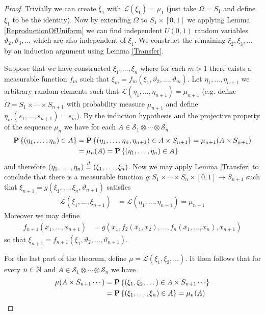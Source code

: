 \begin{proof}
Trivially we can create $\xi_1$ with $\mathcal{L}(\xi_1) = \mu_1$
(just take $\Omega = S_1$ and define $\xi_1$ to be the identity).  Now
by extending $\Omega$ to $S_1 \times [0,1]$ we applying Lemma
\ref{ReproductionOfUniform} we can find independent $U(0,1)$ random
variables $\vartheta_2, \vartheta_3, \dotsc$ which are also
independent of $\xi_1$.  We construct the remaining $\xi_2, \xi_3,
\dotsc$ by an induction argument using Lemma \ref{Transfer}.  

Suppose that we have constructed $\xi_1, \dotsc, \xi_n$ where for each
$m > 1$ there exists a measurable function $f_m$ such that $\xi_m =
f_m(\xi_1, \vartheta_2, \dotsc, \vartheta_m)$.  Let $\eta_1, \dotsc,
\eta_{n+1}$ we arbitrary random elements such that
$\mathcal{L}(\eta_1, \dotsc, \eta_{n+1}) = \mu_{n+1}$ (e.g. define
$\tilde{\Omega} = S_1 \times \dotsb \times S_{n+1}$ with probability
measure $\mu_{n+1}$ and define $\eta_m(s_1, \dotsc, s_{n+1}) = s_m$).
By the induction hypothesis and the projective property of the sequence $\mu_n$ we have for each $A
\in \mathcal{S}_1 \otimes \dotsb \otimes \mathcal{S}_n$
\begin{align*}
\textbf{P}\left \{(\eta_1, \dotsc, \eta_n) \in A \right \} &= \textbf{P}\left \{(\eta_1,
  \dotsc, \eta_n, \eta_{n+1}) \in A \times S_{n+1} \right \} = \mu_{n+1}(A
\times S_{n+1}) \\
&= \mu_n(A) = \textbf{P}\left \{(\eta_1, \dotsc, \eta_n) \in A \right \} 
\end{align*}
and therefore $(\eta_1, \dotsc, \eta_n) \overset{d}= (\xi_1, \dotsc,
\xi_n)$.  Now we may apply Lemma \ref{Transfer} to conclude that there
is a measurable function $g : S_1 \times \dotsb \times S_n \times
[0,1] \to S_{n+1}$ such that $\xi_{n+1} = g(\xi_1, \dotsc, \xi_n,
\vartheta_{n+1})$ satisfies 
\begin{align*}
\mathcal{L}(\xi_1, \dotsc, \xi_{n+1}) &=
\mathcal{L}(\eta_1, \dotsc, \eta_{n+1})  = \mu_{n+1}
\end{align*}
Moreover we may define 
\begin{align*}
f_{n+1}(x_1, \dotsc, x_{n+1}) &= g(x_1,
f_2(x_1, x_2), \dotsc, f_n(x_1, \dotsc, x_n), x_{n+1})
\end{align*} so that
$\xi_{n+1} = f_{n+1}(\xi_1, \vartheta_2, \dotsc, \vartheta_{n+1})$.

For the last part of the theorem, define $\mu = \mathcal{L}(\xi_1,
\xi_2, \dotsc)$.  It then follows that for every $n \in \mathbb{N}$ and
$A \in \mathcal{S}_1 \otimes \dotsb \otimes \mathcal{S}_n$ we have
\begin{align*}
\mu(A \times S_{n+1} \dotsb) &= \probability{(\xi_1, \xi_2, \dotsc)
  \in A \times S_{n+1} \dotsb} \\
&=  \probability{(\xi_1, \dotsc, \xi_n)
  \in A } = \mu_n(A) 
\end{align*}
\end{proof}

